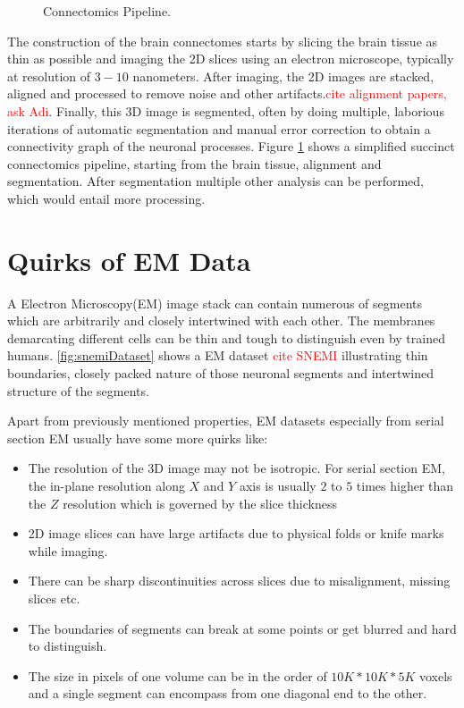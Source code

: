 \begin{figure}[htpb]
\begin{tabular}{XXX}
  \end{tabular}
	\caption{Connectomics Pipeline.}
	\label{fig:connectomicsPipeline}
\end{figure}

The construction of the brain connectomes starts by slicing the brain tissue as thin as possible and imaging the 2D slices using an electron microscope, typically at resolution of $3 - 10$ nanometers. After imaging, the 2D images are stacked, aligned and processed to remove noise and other artifacts.\textcolor{red}{cite alignment papers, ask Adi}. Finally, this 3D image is segmented, often by doing multiple, laborious iterations of automatic segmentation and manual error correction to obtain a connectivity graph of the neuronal processes. Figure \ref{fig:connectomicsPipeline} shows a simplified succinct connectomics pipeline, starting from the brain tissue, alignment and segmentation. After segmentation multiple other analysis can be performed, which would entail more processing.


\section{Quirks of EM Data}
A Electron Microscopy(EM) image stack can contain numerous of segments which are arbitrarily and closely intertwined with each other. The membranes demarcating different cells can be thin and tough to distinguish even by trained humans. \autoref{fig:snemiDataset} shows a EM dataset \textcolor{red}{cite SNEMI} illustrating thin boundaries, closely packed nature of those neuronal segments and intertwined structure of the segments.

Apart from previously mentioned properties, EM datasets especially from serial section EM usually have some more quirks like:
\begin{itemize}
  \item The resolution of the 3D image may not be isotropic. For serial section EM, the in-plane resolution along $X$ and $Y$ axis is usually $2$ to $5$ times higher than the $Z$ resolution which is governed by the slice thickness 
  \item 2D image slices can have large artifacts due to physical folds or knife marks while imaging.
  \item There can be sharp discontinuities across slices due to misalignment, missing slices etc.
  \item The boundaries of segments can break at some points or get blurred and hard to distinguish.
  \item The size in pixels of one volume can be in the order of $10K*10K*5K$ voxels and a single segment can encompass from one diagonal end to the other.
\end{itemize}

